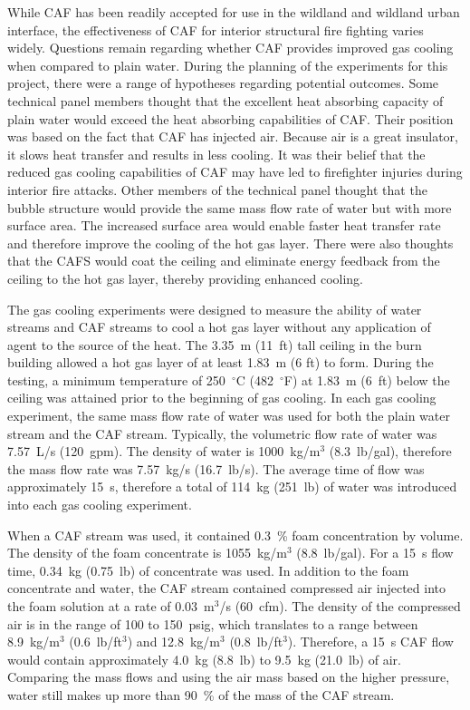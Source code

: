 \documentclass[12pt,oneside]{book}
\begin{document}
While CAF has been readily accepted for use in the wildland and wildland urban interface, the effectiveness of CAF for interior structural fire fighting varies widely. Questions remain regarding whether CAF provides improved gas cooling when compared to plain water. During the planning of the experiments for this project, there were a range of hypotheses regarding potential outcomes. Some technical panel members thought that the excellent heat absorbing capacity of plain water would exceed the heat absorbing capabilities of CAF. Their position was based on the fact that CAF has injected air. Because air is a great insulator, it slows heat transfer and results in less cooling. It was their belief that the reduced gas cooling capabilities of CAF may have led to firefighter injuries during interior fire attacks. Other members of the technical panel thought that the bubble structure would provide the same mass flow rate of water but with more surface area. The increased surface area would enable faster heat transfer rate and therefore improve the cooling of the hot gas layer. There were also thoughts that the CAFS would coat the ceiling and eliminate energy feedback from the ceiling to the hot gas layer, thereby providing enhanced cooling.

The gas cooling experiments were designed to measure the ability of water streams and CAF streams to cool a hot gas layer without any application of agent to the source of the heat. The 3.35~m (11~ft) tall ceiling in the burn building allowed a hot gas layer of at least 1.83~m (6 ft) to form. During the testing, a minimum temperature of 250~$^{\circ}$C (482~$^{\circ}$F) at 1.83~m (6~ft) below the ceiling was attained prior to the beginning of gas cooling. In each gas cooling experiment, the same mass flow rate of water was used for both the plain water stream and the CAF stream. Typically, the volumetric flow rate of water was 7.57~L/s (120~gpm). The density of water is 1000~kg/m$^3$ (8.3~lb/gal), therefore the mass flow rate was 7.57~kg/s (16.7~lb/s). The average time of flow was approximately 15~s, therefore a total of 114~kg (251~lb) of water was introduced into each gas cooling experiment.

When a CAF stream was used, it contained 0.3~\% foam concentration by volume. The density of the foam concentrate is 1055~kg/m$^3$ (8.8~lb/gal). For a 15~s flow time, 0.34~kg (0.75~lb) of concentrate was used. In addition to the foam concentrate and water, the CAF stream contained compressed air injected into the foam solution at a rate of 0.03~m$^3$/s (60~cfm). The density of the compressed air is in the range of 100 to 150~psig, which translates to a range between 8.9~kg/m$^3$ (0.6~lb/ft$^3$) and 12.8~kg/m$^3$ (0.8~lb/ft$^3$). Therefore, a 15~s CAF flow would contain approximately 4.0~kg (8.8~lb) to 9.5~kg (21.0~lb) of air. Comparing the mass flows and using the air mass based on the higher pressure, water still makes up more than 90~\% of the mass of the CAF stream.
\end{document}
